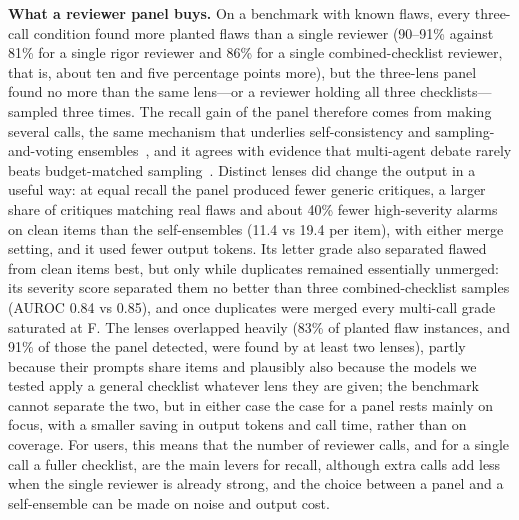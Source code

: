 \documentclass[10pt,letterpaper]{article}
\begin{document}
\textbf{What a reviewer panel buys.} On a benchmark with known flaws, every three-call condition found more planted flaws than a single reviewer (90--91\% against 81\% for a single rigor reviewer and 86\% for a single combined-checklist reviewer, that is, about ten and five percentage points more), but the three-lens panel found no more than the same lens---or a reviewer holding all three checklists---sampled three times. The recall gain of the panel therefore comes from making several calls, the same mechanism that underlies self-consistency and sampling-and-voting ensembles~\cite{wang2023selfconsistency,li2024moreagents}, and it agrees with evidence that multi-agent debate rarely beats budget-matched sampling~\cite{smit2024mad,wang2024rethinking}. Distinct lenses did change the output in a useful way: at equal recall the panel produced fewer generic critiques, a larger share of critiques matching real flaws and about 40\% fewer high-severity alarms on clean items than the self-ensembles (11.4 vs 19.4 per item), with either merge setting, and it used fewer output tokens. Its letter grade also separated flawed from clean items best, but only while duplicates remained essentially unmerged: its severity score separated them no better than three combined-checklist samples (AUROC 0.84 vs 0.85), and once duplicates were merged every multi-call grade saturated at F. The lenses overlapped heavily (83\% of planted flaw instances, and 91\% of those the panel detected, were found by at least two lenses), partly because their prompts share items and plausibly also because the models we tested apply a general checklist whatever lens they are given; the benchmark cannot separate the two, but in either case the case for a panel rests mainly on focus, with a smaller saving in output tokens and call time, rather than on coverage. For users, this means that the number of reviewer calls, and for a single call a fuller checklist, are the main levers for recall, although extra calls add less when the single reviewer is already strong, and the choice between a panel and a self-ensemble can be made on noise and output cost.
\end{document}
